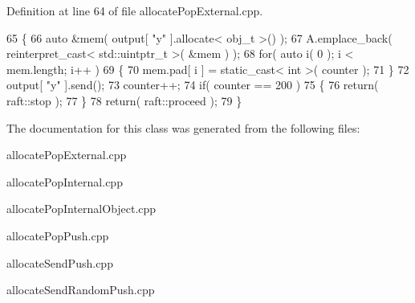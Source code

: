 Definition at line 64 of file allocate\+Pop\+External.\+cpp.


\begin{DoxyCode}
65     \{
66         \textcolor{keyword}{auto} &mem( output[ \textcolor{stringliteral}{"y"} ].allocate< obj\_t >() );
67         A.emplace\_back( reinterpret\_cast< std::uintptr\_t >( &mem ) ); 
68         \textcolor{keywordflow}{for}( \textcolor{keyword}{auto} i( 0 ); i < mem.length; i++ )
69         \{
70             mem.pad[ i ] = \textcolor{keyword}{static\_cast<} \textcolor{keywordtype}{int} \textcolor{keyword}{>}( counter );
71         \}
72         output[ \textcolor{stringliteral}{"y"} ].send();
73         counter++;
74         \textcolor{keywordflow}{if}( counter == 200 )
75         \{
76             \textcolor{keywordflow}{return}( raft::stop );
77         \}
78         \textcolor{keywordflow}{return}( raft::proceed );
79     \}
\end{DoxyCode}


The documentation for this class was generated from the following files\+:\begin{DoxyCompactItemize}
\item 
allocate\+Pop\+External.\+cpp\item 
allocate\+Pop\+Internal.\+cpp\item 
allocate\+Pop\+Internal\+Object.\+cpp\item 
allocate\+Pop\+Push.\+cpp\item 
allocate\+Send\+Push.\+cpp\item 
allocate\+Send\+Random\+Push.\+cpp\end{DoxyCompactItemize}
